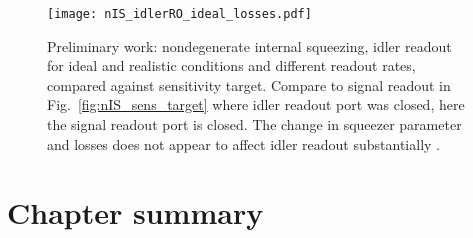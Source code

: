 
\begin{figure}
	\centering
	\texttt{[image: nIS\_idlerRO\_ideal\_losses.pdf]}
	\caption{  Preliminary work: nondegenerate internal squeezing, idler readout for ideal and realistic conditions and different readout rates, compared against sensitivity target. Compare to signal readout in Fig.~\ref{fig:nIS_sens_target} where idler readout port was closed, here the signal readout port is closed. The change in squeezer parameter and losses does not appear to affect idler readout substantially . }
	\label{fig:}
\end{figure}







\section{Chapter summary}




